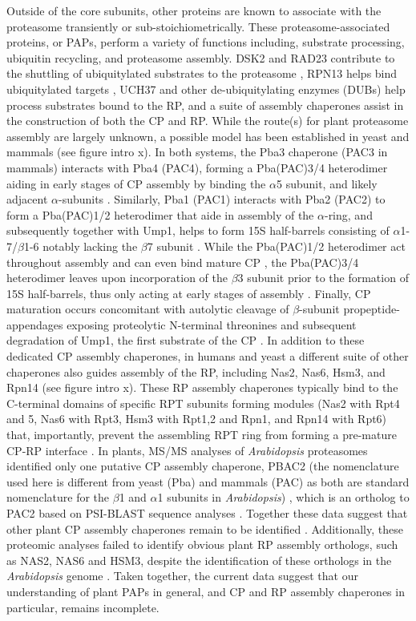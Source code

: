 Outside of the core subunits, other proteins are known to associate with the proteasome transiently or sub-stoichiometrically. These proteasome-associated proteins, or PAPs, perform a variety of functions including, substrate processing, ubiquitin recycling, and proteasome assembly. DSK2 and RAD23 contribute to the shuttling of ubiquitylated substrates to the proteasome \citep{farmer10, fatimababy10, lin11}, RPN13 helps bind ubiquitylated targets \citep{schreiner08}, UCH37 and other de-ubiquitylating enzymes (DUBs) \citep{vanderlinden15} help process substrates bound to the RP, and a suite of assembly chaperones assist in the construction of both the CP and RP.  While the route(s) for plant proteasome assembly are largely unknown, a possible model has been established in yeast and mammals (see figure intro x). In both systems, the Pba3 chaperone (PAC3 in mammals) interacts with Pba4 (PAC4), forming a Pba(PAC)3/4 heterodimer aiding in early stages of CP assembly by binding the $\alpha$5 subunit, and likely adjacent $\alpha$-subunits  \citep{kunjappu14, yashiroda08}. Similarly, Pba1 (PAC1) interacts with Pba2 (PAC2) to form a Pba(PAC)1/2 heterodimer that aide in assembly of the $\alpha$-ring, and subsequently together with Ump1, helps to form 15S half-barrels consisting of $\alpha$1-7/$\beta$1-6 notably lacking the $\beta$7 subunit \citep{kunjappu14, marques07}. While the Pba(PAC)1/2 heterodimer act throughout assembly and can even bind mature CP \citep{stadtmueller12}, the Pba(PAC)3/4 heterodimer leaves upon incorporation of the $\beta$3 subunit prior to the formation of 15S half-barrels, thus only acting at early stages of assembly \citep{hirano08}. Finally, CP maturation occurs concomitant with autolytic cleavage of $\beta$-subunit propeptide-appendages exposing proteolytic N-terminal threonines and subsequent degradation of Ump1, the first substrate of the CP \citep{ramos98}. In addition to these dedicated CP assembly chaperones, in humans and yeast a different suite of other chaperones also guides assembly of the RP, including Nas2, Nas6, Hsm3, and Rpn14 (see figure intro x). These RP assembly chaperones typically bind to the C-terminal domains of specific RPT subunits forming modules (Nas2 with Rpt4 and 5, Nas6 with Rpt3, Hsm3 with Rpt1,2 and Rpn1, and Rpn14 with Rpt6) that, importantly, prevent the assembling RPT ring from forming a pre-mature CP-RP interface \citep{park10}.  In plants, MS/MS analyses of \textit{Arabidopsis} proteasomes identified only one putative CP assembly chaperone, PBAC2 (the nomenclature used here is different from yeast (Pba) and mammals (PAC) as both are standard nomenclature for the $\beta$1 and $\alpha$1 subunits in \textit{Arabidopsis}) \citep{book10}, which is an ortholog to PAC2 based on PSI-BLAST sequence analyses \citep{kusmierczyk11, le07}. Together these data suggest that other plant CP assembly chaperones remain to be identified \citep{book10}.  Additionally, these proteomic analyses failed to identify obvious plant RP assembly orthologs, such as NAS2, NAS6 and HSM3, despite the identification of these orthologs in the \textit{Arabidopsis} genome \citep{book10}. Taken together, the current data suggest that our understanding of plant PAPs in general, and CP and RP assembly chaperones in particular, remains incomplete.
